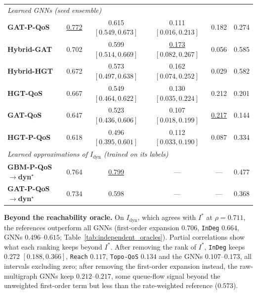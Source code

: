 \documentclass[preprint,3p]{elsarticle}
\begin{document}
\begin{table}[htbp]
{\begin{tabular}{lccccc}
\midrule
\multicolumn{6}{l}{\textit{Learned GNNs (seed ensemble)}} \\
\textbf{GAT-P-QoS} & \underline{0.772} & 0.615 $[0.549, 0.673]$ & 0.111 $[0.016, 0.213]$ & 0.182 & 0.274 \\
\textbf{Hybrid-GAT} & 0.702 & 0.599 $[0.514, 0.669]$ & \underline{0.173} $[0.082, 0.267]$ & 0.056 & 0.585 \\
\textbf{Hybrid-HGT} & 0.672 & 0.573 $[0.497, 0.638]$ & 0.162 $[0.074, 0.252]$ & 0.029 & 0.582 \\
\textbf{HGT-QoS} & 0.667 & 0.549 $[0.464, 0.622]$ & 0.130 $[0.035, 0.224]$ & 0.212 & 0.201 \\
\textbf{GAT-QoS} & 0.647 & 0.523 $[0.436, 0.606]$ & 0.107 $[0.018, 0.199]$ & \underline{0.217} & 0.144 \\
\textbf{HGT-P-QoS} & 0.618 & 0.496 $[0.395, 0.601]$ & 0.112 $[0.033, 0.190]$ & 0.087 & 0.334 \\
\midrule
\multicolumn{6}{l}{\textit{Learned approximations of $I_{\text{dyn}}$ (trained on its labels)}} \\
\textbf{GBM-P-QoS$\to$dyn$^\star$} & 0.764 & \underline{0.799} & --- & --- & 0.477 \\
\textbf{GAT-P-QoS$\to$dyn$^\star$} & 0.734 & 0.598 & --- & --- & 0.368 \\
\bottomrule
\end{tabular}%
}
\end{table}

\noindent\textbf{Beyond the reachability oracle.} On $I_{\text{dyn}}$, which agrees with $I^*$ at $\rho = 0.711$, the references outperform all GNNs (first-order expansion $0.706$, \texttt{InDeg} $0.664$, GNNs $0.496$--$0.615$; Table~\ref{tab:independent_oracles}). Partial correlations show what each ranking keeps beyond $I^*$. After removing the rank of $I^*$, \texttt{InDeg} keeps $0.272$ $[0.188, 0.366]$, \texttt{Reach} $0.117$, \texttt{Topo-QoS} $0.134$ and the GNNs $0.107$--$0.173$, all intervals excluding zero; after removing the first-order expansion instead, the raw-multigraph GNNs keep $0.212$--$0.217$, some queue-flow signal beyond the unweighted first-order term but less than the rate-weighted reference ($0.573$).
\end{document}
